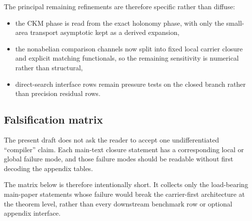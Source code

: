 \documentclass[11pt,a4paper]{article}
\theoremstyle{definition}
\theoremstyle{remark}
\begin{document}
The principal remaining refinements are therefore specific rather than diffuse:
\begin{itemize}[leftmargin=1.5em, topsep=3pt, itemsep=2pt]
    \item the CKM phase is read from the exact holonomy phase, with only the small-area transport asymptotic kept as a derived expansion,
    \item the nonabelian comparison channels now split into fixed local carrier closure and explicit matching functionals, so the remaining sensitivity is numerical rather than structural,
    \item direct-search interface rows remain pressure tests on the closed branch rather than precision residual rows.
\end{itemize}

\subsection{Falsification matrix}

The present draft does not ask the reader to accept one undifferentiated \enquote{compiler} claim. Each main-text closure statement has a corresponding local or global failure mode, and those failure modes should be readable without first decoding the appendix tables.

The matrix below is therefore intentionally short. It collects only the load-bearing main-paper statements whose failure would break the carrier-first architecture at the theorem level, rather than every downstream benchmark row or optional appendix interface.
\end{document}
